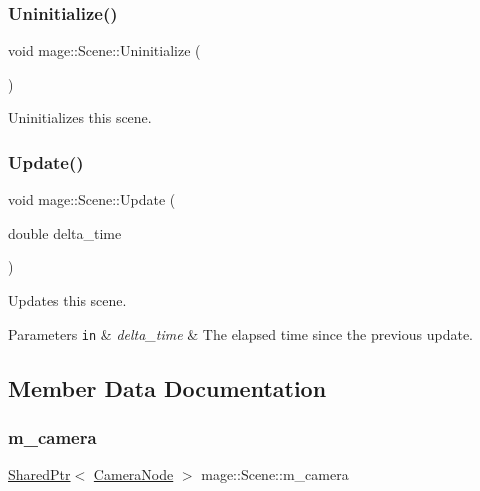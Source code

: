 \subsubsection{\texorpdfstring{Uninitialize()}{Uninitialize()}}
{\footnotesize\ttfamily void mage\+::\+Scene\+::\+Uninitialize (\begin{DoxyParamCaption}{ }\end{DoxyParamCaption})}

Uninitializes this scene. \hypertarget{classmage_1_1_scene_aa10e6eafc00834f63f146589326cbfe2}{}\label{classmage_1_1_scene_aa10e6eafc00834f63f146589326cbfe2} 
\subsubsection{\texorpdfstring{Update()}{Update()}}
{\footnotesize\ttfamily void mage\+::\+Scene\+::\+Update (\begin{DoxyParamCaption}\item[{double}]{delta\+\_\+time }\end{DoxyParamCaption})}

Updates this scene.


\begin{DoxyParams}[1]{Parameters}
\mbox{\tt in}  & {\em delta\+\_\+time} & The elapsed time since the previous update. \\
\hline
\end{DoxyParams}


\subsection{Member Data Documentation}
\hypertarget{classmage_1_1_scene_a39c785951d9fb99477c1894eabba0cc6}{}\label{classmage_1_1_scene_a39c785951d9fb99477c1894eabba0cc6} 
\subsubsection{\texorpdfstring{m\+\_\+camera}{m\_camera}}
{\footnotesize\ttfamily \hyperlink{namespacemage_a1e01ae66713838a7a67d30e44c67703e}{Shared\+Ptr}$<$ \hyperlink{classmage_1_1_camera_node}{Camera\+Node} $>$ mage\+::\+Scene\+::m\+\_\+camera\hspace{0.3cm}{\ttfamily [private]}}

